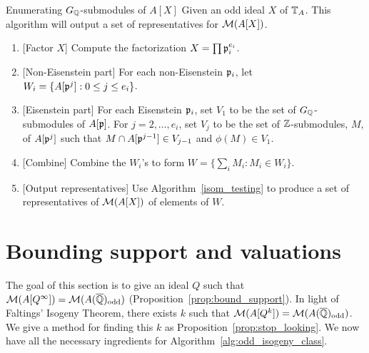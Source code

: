 \documentclass[11pt, proquest]{uwthesis}
\begin{document}
\begin{algorithm}{Enumerating $G_{\mathbb{Q}}$-submodules of {$A[X]$}}
    Given an odd ideal $X$ of $\mathbb{T}_A$. This algorithm will output a set of
    representatives for $\mathcal{M}(A[X])$.
    \begin{enumerate}
        \item{} [Factor $X$]
            Compute the factorization $X=\prod \mathfrak{p}_i ^{e_i}$.
        \item{} [Non-Eisenstein part]
            For each non-Eisenstein $\mathfrak{p}_i$, let $W_i=\{A[\mathfrak{p}^j]: 0 \leq j
            \leq e_i\}$.
        \item{} [Eisenstein part]
            For each Eisenstein $\mathfrak{p}_i$, set $V_1$ to be the set of
            $G_{\mathbb{Q}}$-submodules of $A[\mathfrak{p}]$. For $j=2,\ldots,e_i$, set $V_j$ to
            be the set of $\mathbb{Z}$-submodules, $M$, of $A[\mathfrak{p}^j]$ such that $M\cap
            A[\mathfrak{p}^{j-1}]\in V_{j-1}$ and $\phi(M)\in V_1$.
        \item{} [Combine]
            Combine the $W_i$'s to form $W=\{\sum_i M_i: M_i \in W_i\}$.
        \item{} [Output representatives]
            Use Algorithm~\ref{isom_testing} to produce a set of
            representatives of $\mathcal{M}(A[X])$ of elements of $W$.
    \end{enumerate}
\end{algorithm}

\section{Bounding support and valuations}%
\label{sec:bounding_support_and_valuations}

The goal of this section is to give an ideal $Q$ such that
$\mathcal{M}(A[Q^\infty])=\mathcal{M}(A(\overline{\mathbb{Q}})_{\mathrm{odd}})$ (Proposition~\ref{prop:bound_support}). In
light of Faltings' Isogeny Theorem, there exists $k$ such that
$\mathcal{M}(A[Q^k])=\mathcal{M}(A(\overline{\mathbb{Q}})_{\mathrm{odd}})$. We give a method for finding this $k$ as
Proposition~\ref{prop:stop_looking}. We now have all the necessary ingredients
for Algorithm~\ref{alg:odd_isogeny_class}.
\end{document}
